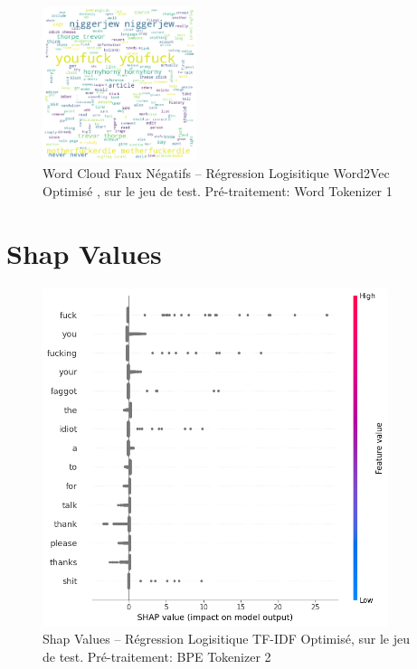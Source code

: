 \begin{figure}[h]
    \centering
    \includegraphics[width=0.4\textwidth]{figures/word-cloud-reg-w2v-fn.png}
    \caption{Word Cloud Faux Négatifs – Régression Logisitique Word2Vec Optimisé , sur le jeu de test. Pré-traitement:  Word Tokenizer 1}
\end{figure}

\newpage

\section{Shap Values}
\begin{figure}[h]
    \centering
    \includegraphics[width=0.9\textwidth]{figures/reg-tf-shap.png}
    \caption{Shap Values – Régression Logisitique TF-IDF Optimisé, sur le jeu de test. Pré-traitement: BPE Tokenizer 2}
\end{figure}